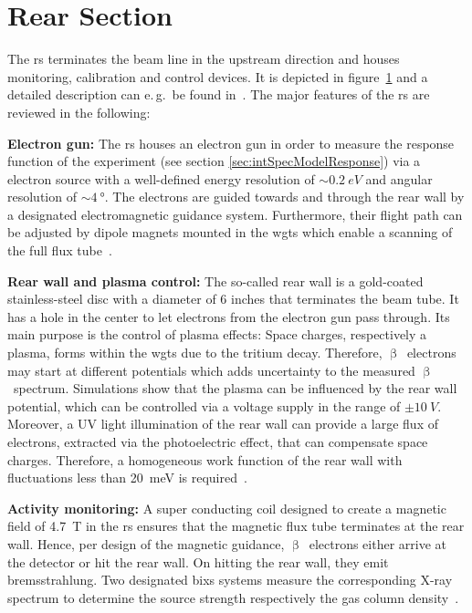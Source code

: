 \section{Rear Section}
\label{sec:katrinExpSetupRearSection}
\begin{figure}[t]
 \label{fig:rearSection}
\end{figure}

The \gls{rs} terminates the beam line in the upstream direction and houses monitoring, calibration and control devices. It is depicted in figure~\ref{fig:rearSection} and a detailed description can e.\,g.~be found in~\cite{Babutzka2014}. The major features of the \gls{rs} are reviewed in the following:

{\par\textbf{Electron gun:}
The \gls{rs} houses an electron gun in order to measure the response function of the experiment (see section \ref{sec:intSpecModelResponse}) via a electron source with a well-defined energy resolution of $\sim \SI{0.2}{eV}$ and angular resolution of $\sim \SI{4}{\degree}$. The electrons are guided towards and through the rear wall by a designated electromagnetic guidance system. Furthermore, their flight path can be adjusted by dipole magnets mounted in the \gls{wgts} which enable a scanning of the full flux tube~\cite{Babutzka2014}.}

{\par \textbf{Rear wall and plasma control:}
The so-called rear wall is a gold-coated stainless-steel disc with a diameter of 6 inches that terminates the beam tube. It has a hole in the center to let electrons from the electron gun pass through. Its main purpose is the control of plasma effects: Space charges, respectively a plasma, forms within the \gls{wgts} due to the tritium decay. Therefore, $\upbeta$~electrons may start at different potentials which adds uncertainty to the measured $\upbeta$~spectrum. Simulations show that the plasma can be influenced by the rear wall potential, which can be controlled via a voltage supply in the range of $\pm \SI{10}{V}$. Moreover, a UV light illumination of the rear wall can provide a large flux of electrons, extracted via the photoelectric effect, that can compensate space charges. Therefore, a homogeneous work function of the rear wall with fluctuations less than \SI{20}{meV} is required~\cite{Kuckert2018, Kuckert2016}.}

{\par\textbf{Activity monitoring:}
A super conducting coil designed to create a magnetic field of \SI{4.7}{T} in the \gls{rs} ensures that the magnetic flux tube terminates at the rear wall. Hence, per design of the magnetic guidance, $\upbeta$~electrons either arrive at the detector or hit the rear wall. On hitting the rear wall, they emit bremsstrahlung. Two designated \gls{bixs} systems measure the corresponding X-ray spectrum to determine the source strength respectively the gas column density~\cite{Roellig2015}.}

